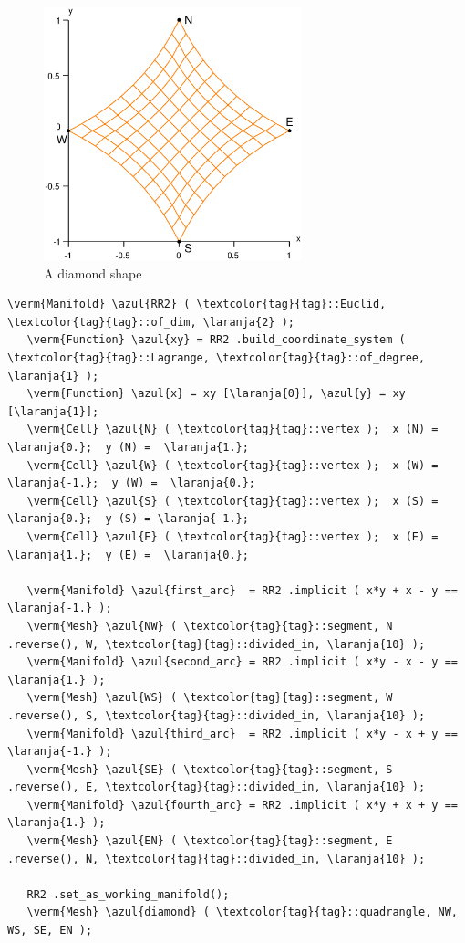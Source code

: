 \begin{figure}[ht] \centering
  \includegraphics[width=75mm]{diamond}
  \caption{A diamond shape}
  \label{\numb section 2.\numb fig 11}
\end{figure}

\begin{Verbatim}[commandchars=\\\{\},formatcom=\small\tt,frame=single,
   label=parag-\ref{\numb section 2.\numb parag 11}.cpp,rulecolor=\color{moldura},
   baselinestretch=0.94,framesep=2mm]
   \verm{Manifold} \azul{RR2} ( \textcolor{tag}{tag}::Euclid, \textcolor{tag}{tag}::of_dim, \laranja{2} );
   \verm{Function} \azul{xy} = RR2 .build_coordinate_system ( \textcolor{tag}{tag}::Lagrange, \textcolor{tag}{tag}::of_degree, \laranja{1} );
   \verm{Function} \azul{x} = xy [\laranja{0}], \azul{y} = xy [\laranja{1}];
   \verm{Cell} \azul{N} ( \textcolor{tag}{tag}::vertex );  x (N) =  \laranja{0.};  y (N) =  \laranja{1.};
   \verm{Cell} \azul{W} ( \textcolor{tag}{tag}::vertex );  x (W) = \laranja{-1.};  y (W) =  \laranja{0.};
   \verm{Cell} \azul{S} ( \textcolor{tag}{tag}::vertex );  x (S) =  \laranja{0.};  y (S) = \laranja{-1.};
   \verm{Cell} \azul{E} ( \textcolor{tag}{tag}::vertex );  x (E) =  \laranja{1.};  y (E) =  \laranja{0.};

   \verm{Manifold} \azul{first_arc}  = RR2 .implicit ( x*y + x - y == \laranja{-1.} );
   \verm{Mesh} \azul{NW} ( \textcolor{tag}{tag}::segment, N .reverse(), W, \textcolor{tag}{tag}::divided_in, \laranja{10} );
   \verm{Manifold} \azul{second_arc} = RR2 .implicit ( x*y - x - y ==  \laranja{1.} );
   \verm{Mesh} \azul{WS} ( \textcolor{tag}{tag}::segment, W .reverse(), S, \textcolor{tag}{tag}::divided_in, \laranja{10} );
   \verm{Manifold} \azul{third_arc}  = RR2 .implicit ( x*y - x + y == \laranja{-1.} );
   \verm{Mesh} \azul{SE} ( \textcolor{tag}{tag}::segment, S .reverse(), E, \textcolor{tag}{tag}::divided_in, \laranja{10} );
   \verm{Manifold} \azul{fourth_arc} = RR2 .implicit ( x*y + x + y ==  \laranja{1.} );
   \verm{Mesh} \azul{EN} ( \textcolor{tag}{tag}::segment, E .reverse(), N, \textcolor{tag}{tag}::divided_in, \laranja{10} );
   
   RR2 .set_as_working_manifold();
   \verm{Mesh} \azul{diamond} ( \textcolor{tag}{tag}::quadrangle, NW, WS, SE, EN );
\end{Verbatim}

